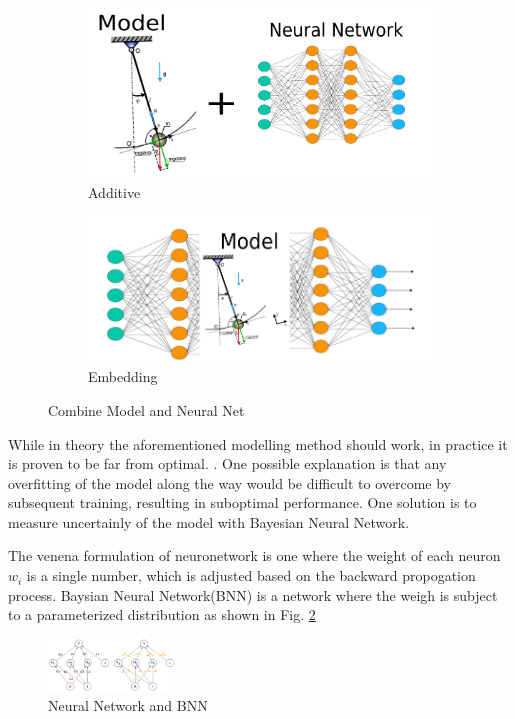 \documentclass[journal]{IEEEtran}
\begin{document}
\begin{figure}[H]
\centering
\begin{subfigure}{0.25\textwidth}
  \centering
  \includegraphics[width=\linewidth]{combine1.png}
  \caption{Additive}
\end{subfigure}%
\begin{subfigure}{.25\textwidth}
  \centering
  \includegraphics[width=\linewidth]{combine2.png}
  \caption{Embedding}
\end{subfigure}
\caption{Combine Model and Neural Net}
\label{fig:combine}
\end{figure}




While in theory the aforementioned modelling method should work, in practice it is proven to be far from optimal.  \cite{8463189}. One possible explanation is that any overfitting of the model along the way would be difficult to overcome by subsequent training, resulting in suboptimal performance. One solution is to measure uncertainly of the model with Bayesian Neural Network.

The venena formulation of neuronetwork is one where the weight of each neuron $w_i$ is a single number, which is adjusted based on the backward propogation process. Baysian Neural Network(BNN) is a network where the weigh is subject to a parameterized distribution as shown in Fig. \ref{fig:2}
\begin{figure}[H]
    \centering
    \includegraphics[width=0.3\textwidth]{bnn.png}
    \caption{Neural Network and BNN}
    \label{fig:2}
\end{figure}
\end{document}
